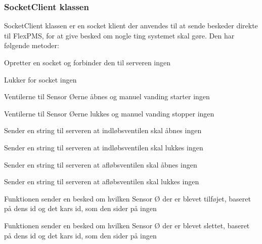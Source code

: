 \subsubsection{SocketClient klassen}
SocketClient klassen er en socket klient der anvendes til at sende beskeder direkte til FlexPMS, for at give besked om nogle ting systemet skal gøre. Den har følgende metoder:

{Opretter en socket og forbinder den til serveren}
{ingen}

{Lukker for socket}
{ingen}

{Ventilerne til Sensor Øerne åbnes og manuel vanding starter}
{ingen}
{
}

{Ventilerne til Sensor Øerne lukkes og manuel vanding stopper}
{ingen}
{
}

{Sender en string til serveren at indløbsventilen skal åbnes}
{ingen}
{
}

{Sender en string til serveren at indløbsventilen skal lukkes}
{ingen}
{
}

{Sender en string til serveren at afløbsventilen skal åbnes}
{ingen}
{
}

{Sender en string til serveren at afløbsventilen skal lukkes}
{ingen}
{
}

{Funktionen sender en besked om hvilken Sensor Ø der er blevet tilføjet, baseret på dens id og det kars id, som den sider på}
{ingen}
{
}


{Funktionen sender en besked om hvilken Sensor Ø der er blevet slettet, baseret på dens id og det kars id, som den sider på}
{ingen}
{
}